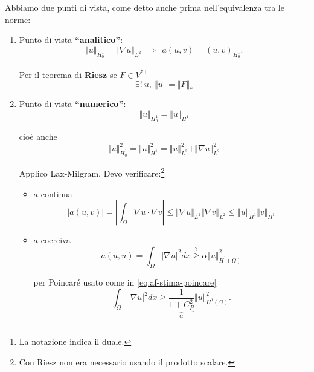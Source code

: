 \documentclass[10pt,a4paper,twoside,openright]{book}
\begin{document}
Abbiamo due punti di vista, come detto anche prima nell'equivalenza tra le norme:
\begin{enumerate}
	\item Punto di vista \textbf{``analitico''}: 
	      \begin{equation*}
	      	\boxed{\Vert u\Vert _{H_{0}^{1}} =\Vert \nabla u\Vert _{L^{2}}} \ \ \Rightarrow \ \ a( u,v) =( u,v)_{H_{0}^{1}} .
	      \end{equation*}
	      
	      Per il teorema di \textbf{Riesz }se $\displaystyle F\in V^{*}$\footnote{La notazione indica il duale.}
	      \begin{equation*}
	      	\exists !\ u,\ \Vert u\Vert =\Vert F\Vert _{*}
	      \end{equation*}
	\item Punto di vista \textbf{``numerico''}:
	      \begin{equation*}
	      	\boxed{\Vert u\Vert _{H_{0}^{1}} =\Vert u\Vert _{H^{1}}}
	      \end{equation*}
	      
	      cioè anche
	      \begin{equation*}
	      	\Vert u\Vert _{H_{0}^{1}}^{2} =\Vert u\Vert _{H^{1}}^{2} =\Vert u\Vert _{L^{2}}^{2} +\Vert \nabla u\Vert _{L^{2}}^{2}
	      \end{equation*}
	      
	      Applico Lax-Milgram. Devo verificare:\footnote{Con Riesz non era necessario usando il prodotto scalare.}
	      \begin{itemize}
	      	\item $\displaystyle a$ continua
	      	      \begin{equation*}
	      	      	| a( u,v)| =\left| \int _{\Omega } \nabla u\cdotp \nabla v\right| \leqslant \Vert \nabla u\Vert _{L^{2}}\Vert \nabla v\Vert _{L^{2}} \leqslant \Vert u\Vert _{H^{1}}\Vert v\Vert _{H^{1}}
	      	      \end{equation*}
	      	\item $\displaystyle a$ coerciva
	      	      \begin{equation*}
	      	      	a( u,u) =\int _{\Omega }| \nabla u| ^{2} dx\overset{?}{\geqslant } \alpha \Vert u\Vert _{H^{1}( \Omega )}^{2}
	      	      \end{equation*}
	      	      
	      	      per Poincaré usato come in \eqref{eq:af-stima-poincare}
	      	      \begin{equation*}
	      	      	\int _{\Omega }| \nabla u| ^{2} dx\geqslant \underbrace{\frac{1}{1+C_{P}^{2}}}_{\alpha}\Vert u\Vert _{H^{1}( \Omega )}^{2} .
	      	      \end{equation*}
	      \end{itemize}
\end{enumerate}
\end{document}
